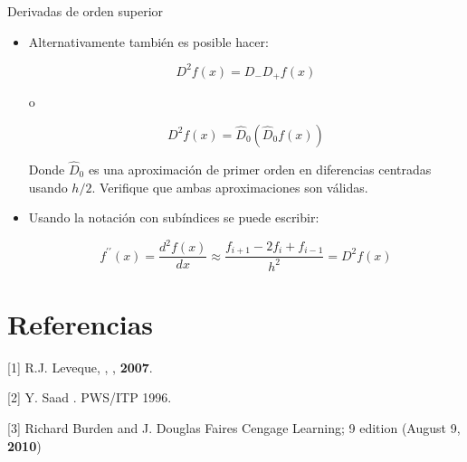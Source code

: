 \documentclass{beamer}
\begin{document}
\begin{frame}{Derivadas de orden superior}
	
	\begin{itemize}
		\item Alternativamente también es posible hacer:
		
		
		\[
		D^2 f(x) = D_- D_+ f(x)
		\]
		
		o
		
		\[
		D^2 f(x) = \hat{D}_0 (\hat{D}_0 f(x))
		\]
		
		Donde $\hat{D}_0$ es una aproximación de primer orden en diferencias centradas usando $h/2$.
		Verifique que ambas aproximaciones son válidas.
		
		\item Usando la notación con subíndices se puede escribir:
		
		\begin{equation}\label{eq:segundaDer}
		\boxed{f^{\prime\prime}(x) = \frac{d^2 f(x)}{d x} \approx \frac{f_{i+1} - 2 f_{i} + f_{i-1}}{h^2} = D^2 f(x)}
		\end{equation}
	\end{itemize}	
\end{frame}

\section<presentation>{Referencias}

\begin{frame}[allowframebreaks]
	
\begin{thebibliography}{10}
		
{\footnotesize 

\beamertemplatebookbibitems


[1] R.J. Leveque,
,
, \textbf{2007}.

[2] Y. Saad
.
\newblock PWS/ITP 1996.

[3]  Richard Burden and J. Douglas Faires
\newblock Cengage Learning; 9 edition (August 9, \textbf{2010})

\beamertemplatearticlebibitems



}
		
\end{thebibliography}
\end{frame}
\end{document}
